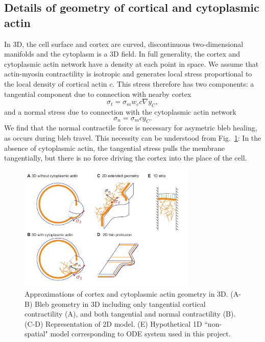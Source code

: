 \subsection{Details of geometry of cortical and cytoplasmic actin}
In 3D, the cell surface and cortex are curved, discontinuous two-dimensional manifolds and the cytoplasm is a 3D field. In full generality, the cortex and cytoplasmic actin network have a density at each point in space. We assume that actin-myosin contractility is isotropic and generates local stress proportional to the local density of cortical actin $c$. This stress therefore has two components: a tangential component due to connection with nearby cortex 
\begin{equation}
\sigma_t = \sigma_m w_c c \nabla y_C, 
\end{equation}
and a normal stress due to connection with the cytoplasmic actin network
\begin{equation}
\sigma_n = \sigma_m c y_C. 
\end{equation}
We find that the normal contractile force is necessary for asymetric bleb healing, as occurs during bleb travel. This necessity can be understood from Fig.~\ref{fig::blebgeometry}: In the absence of cytoplasmic actin, the tangential stress pulls the membrane tangentially, but there is no force driving the cortex into the place of the cell. 

\begin{figure}
   \begin{center}
   \captionsetup{width=5.5in}
	\includegraphics*[width=8.5cm]{Project1/figs/figBlebGeometry.pdf}
      \caption{Approximations of cortex and cytoplasmic actin geometry in 3D. (A-B) Bleb geometry in 3D including only tangential cortical contractility (A), and both tangential and normal contractility (B). (C-D) Representation of 2D model. (E) Hypothetical 1D ``non-spatial" model corresponding to ODE system used in this project.}
      \label{fig::blebgeometry}
   \end{center}
\end{figure}

